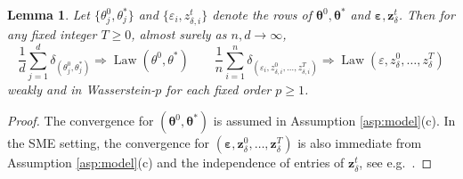 \documentclass[11pt,letterpaper,reqno]{amsart}
\newtheorem{lem}[thm]{Lemma}
\theoremstyle{definition}
\def\eps{\varepsilon}
\def\Law{\operatorname{Law}}
\def\z{\mathbf{z}}
\def\beps{\boldsymbol{\varepsilon}}
\def\btheta{\boldsymbol{\theta}}
\begin{document}
\begin{lem}\label{lem:initialconditions}
Let $\{\theta_j^0,\theta_j^*\}$ and
$\{\eps_i,z_{\delta,i}^t\}$ denote the rows of
$\btheta^0,\btheta^*$ and $\beps,\z_\delta^t$.
Then for any fixed integer $T \geq 0$, almost surely as $n,d \to \infty$,
\[\frac{1}{d}\sum_{j=1}^d
\delta_{(\theta_j^0,\theta_j^*)} \Rightarrow \Law(\theta^0,\theta^*)
\qquad \frac{1}{n}\sum_{i=1}^n
\delta_{(\eps_i,z_{\delta,i}^0,\ldots,z_{\delta,i}^T)}
\Rightarrow \Law(\eps,z_\delta^0,\ldots,z_\delta^T)\]
weakly and in Wasserstein-$p$ for each fixed order $p \geq 1$.
\end{lem}
\begin{proof}
The convergence for $(\btheta^0,\btheta^*)$ is assumed in
Assumption \ref{asp:model}(c).
In the SME setting, the convergence for
$(\beps,\z_\delta^0,\ldots,\z_\delta^T)$ is also immediate from Assumption
\ref{asp:model}(c) and the independence of entries of $\z_\delta^t$,
see e.g.\ \cite[Proposition E.1]{fan2022approximate}.


\end{proof}
\end{document}
